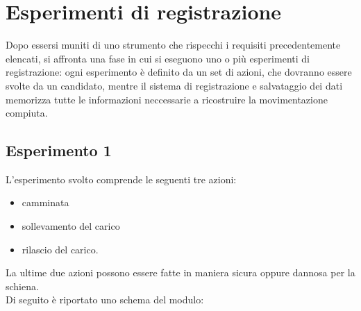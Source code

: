 \documentclass[a4paper, oneside]{book}
\begin{document}
\clearpage

	\section{Esperimenti di registrazione}
Dopo essersi muniti di uno strumento che rispecchi i requisiti precedentemente elencati, si  affronta una fase in cui si eseguono uno o più esperimenti di registrazione: ogni esperimento è definito da un set di azioni, che dovranno essere svolte da un candidato, mentre il sistema di registrazione e salvataggio dei dati memorizza tutte le informazioni neccessarie a ricostruire la movimentazione compiuta.

	\subsection{Esperimento 1}
L’esperimento svolto comprende le seguenti tre azioni:
\begin {itemize}
\item camminata
\item sollevamento del carico 
\item rilascio del carico.
\end{itemize}
La ultime due azioni possono essere fatte in maniera sicura oppure dannosa per la schiena. \\
Di seguito è riportato uno schema del modulo:\\
\end{document}
